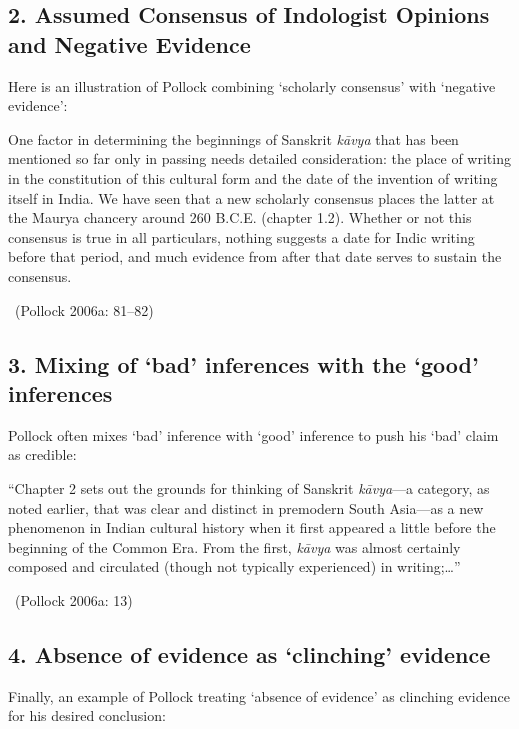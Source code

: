\subsection*{2. Assumed Consensus of Indologist Opinions and Negative Evidence}

Here is an illustration of Pollock combining ‘scholarly consensus’ with ‘negative evidence’:

\begin{myquote}
One factor in determining the beginnings of Sanskrit \textit{kāvya} that has been mentioned so far only in passing needs detailed consideration: the place of writing in the constitution of this cultural form and the date of the invention of writing itself in India. We have seen that a new scholarly consensus places the latter at the Maurya chancery around 260 B.C.E. (chapter 1.2). Whether or not this consensus is true in all particulars, nothing suggests a date for Indic writing before that period, and much evidence from after that date serves to sustain the consensus. 

~\hfill (Pollock 2006a: 81–82)
\end{myquote}


\subsection*{3. Mixing of ‘bad’ inferences with the ‘good’ inferences}

Pollock often mixes ‘bad’ inference with ‘good’ inference to push his ‘bad’ claim as credible:

\begin{myquote}
“Chapter 2 sets out the grounds for thinking of Sanskrit \textit{kāvya}—a category, as noted earlier, that was clear and distinct in premodern South Asia—as a new phenomenon in Indian cultural history when it ﬁrst appeared a little before the beginning of the Common Era. From the ﬁrst, \textit{kāvya} was almost certainly composed and circulated (though not typically experienced) in writing;…” 

~\hfill (Pollock 2006a: 13)
\end{myquote}


\subsection*{4. Absence of evidence as ‘clinching’ evidence}

Finally, an example of Pollock treating ‘absence of evidence’ as clinching evidence for his desired conclusion:

